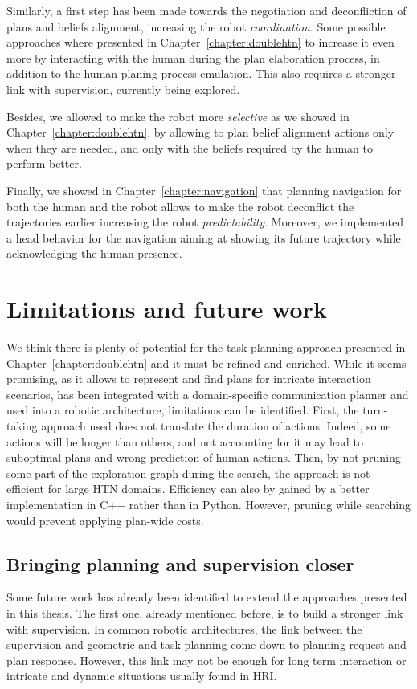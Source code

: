 \documentclass[a4paper,11pt,twoside]{StyleThese}
\begin{document}
Similarly, a first step has been made towards the negotiation and deconfliction of plans and beliefs alignment, increasing the robot \textit{coordination}. Some possible approaches where presented in Chapter~\ref{chapter:doublehtn} to increase it even more by interacting with the human during the plan elaboration process, in addition to the human planing process emulation. This also requires a stronger link with supervision, currently being explored.

Besides, we allowed to make the robot more \textit{selective} as we showed in Chapter~\ref{chapter:doublehtn}, by allowing to plan belief alignment actions only when they are needed, and only with the beliefs required by the human to perform better.

Finally, we showed in Chapter~\ref{chapter:navigation} that planning navigation for both the human and the robot allows to make the robot deconflict the trajectories earlier increasing the robot \textit{predictability}. Moreover, we implemented a head behavior for the navigation aiming at showing its future trajectory while acknowledging the human presence.

\section*{Limitations and future work}
We think there is plenty of potential for the task planning approach presented in Chapter~\ref{chapter:doublehtn} and it must be refined and enriched. While it seems promising, as it allows to represent and find plans for intricate interaction scenarios, has been integrated with a domain-specific communication planner and used into a robotic architecture, limitations can be identified. First, the turn-taking approach used does not translate the duration of actions. Indeed, some actions will be longer than others, and not accounting for it may lead to suboptimal plans and wrong prediction of human actions. Then, by not pruning some part of the exploration graph during the search, the approach is not efficient for large HTN domains. Efficiency can also by gained by a better implementation in C++ rather than in Python. However, pruning while searching would prevent applying plan-wide costs.


\subsection*{Bringing planning and supervision closer}
Some future work has already been identified to extend the approaches presented in this thesis. The first one, already mentioned before, is to build a stronger link with supervision. In common robotic architectures, the link between the supervision and geometric and task planning come down to planning request and plan response. However, this link may not be enough for long term interaction or intricate and dynamic situations usually found in HRI.
\end{document}
